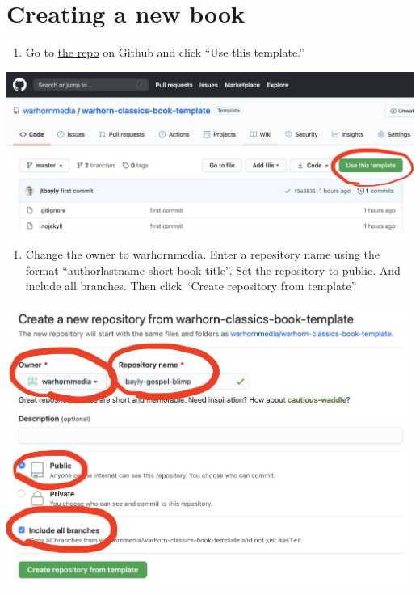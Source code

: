 \documentclass[
]{book}
\providecommand{\tightlist}{%
  \setlength{\itemsep}{0pt}\setlength{\parskip}{0pt}}
\begin{document}
\hypertarget{creating-a-new-book}{%
\section{Creating a new book}\label{creating-a-new-book}}

\begin{enumerate}
\def\labelenumi{\arabic{enumi}.}
\tightlist
\item
  Go to \href{https://github.com/warhornmedia/warhorn-classics-book-template}{the repo} on Github and click ``Use this template.''
\end{enumerate}

\begin{center}\includegraphics[width=0.65\linewidth]{images/screenshot1} \end{center}

\begin{enumerate}
\def\labelenumi{\arabic{enumi}.}
\setcounter{enumi}{1}
\tightlist
\item
  Change the owner to warhornmedia. Enter a repository name using the format ``authorlastname-short-book-title''. Set the repository to public. And include all branches. Then click ``Create repository from template''
\end{enumerate}

\begin{center}\includegraphics[width=0.65\linewidth]{images/screenshot2} \end{center}
\end{document}
